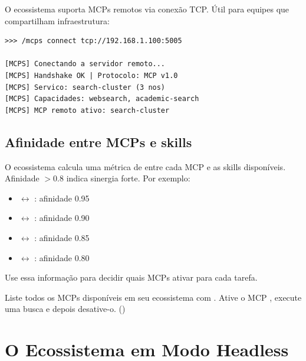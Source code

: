 O ecossistema suporta MCPs remotos via conexão TCP. Útil para equipes que
compartilham infraestrutura:

\begin{lstlisting}[style=bashstyle, caption={Conectando um MCP remoto},
label={lst:mcp-remote}]
>>> /mcps connect tcp://192.168.1.100:5005

[MCPS] Conectando a servidor remoto...
[MCPS] Handshake OK | Protocolo: MCP v1.0
[MCPS] Servico: search-cluster (3 nos)
[MCPS] Capacidades: websearch, academic-search
[MCPS] MCP remoto ativo: search-cluster
\end{lstlisting}

\subsection{Afinidade entre MCPs e skills}
\label{subsec:afinidade}

O ecossistema calcula uma métrica de  entre cada MCP e
as skills disponíveis. Afinidade $> 0.8$ indica sinergia forte. Por
exemplo:

\begin{itemize}
\item {} $\leftrightarrow$ :
      afinidade 0.95
\item {} $\leftrightarrow$ :
      afinidade 0.90
\item {} $\leftrightarrow$ :
      afinidade 0.85
\item {} $\leftrightarrow$ :
      afinidade 0.80
\end{itemize}

Use essa informação para decidir quais MCPs ativar para cada tarefa.

\begin{exercicio}
Liste todos os MCPs disponíveis em seu ecossistema com
. Ative o MCP , execute
uma busca e depois desative-o. (\nivelintermediario)
\end{exercicio}

\section{O Ecossistema em Modo Headless}
\label{sec:headless}
\nivelavancado


